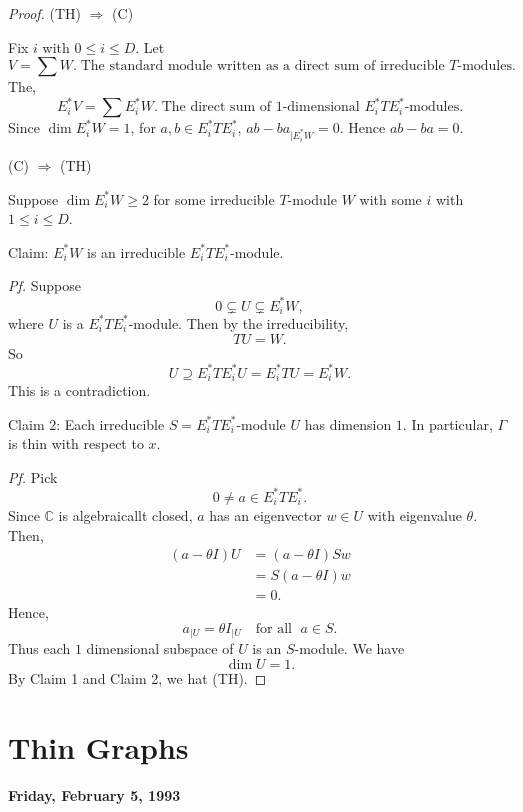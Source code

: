 \documentclass[
]{book}
\theoremstyle{definition}
\theoremstyle{definition}
\theoremstyle{definition}
\theoremstyle{definition}
\theoremstyle{remark}
\begin{document}
\begin{proof}
\leavevmode

(TH) \(\Rightarrow\) (C)

Fix \(i\) with \(0\leq i\leq D\). Let
\[V = \sum W. \; \text{The standard module written as a direct sum of irreducible $T$-modules}.\]
The,
\[E_i^*V = \sum E_i^*W. \; \text{The direct sum of 1-dimensional $E_i^*TE_i^*$-modules}.\]
Since \(\dim E_i^*W = 1\), for \(a, b\in E_i^*TE_i^*\), \({ab - ba}_{| E_i^*W} = 0\). Hence \(ab - ba = 0\).

(C) \(\Rightarrow\) (TH)

Suppose \(\dim E_i^*W \geq 2\) for some irreducible \(T\)-module \(W\) with some \(i\) with \(1\leq i\leq D\).

Claim: \(E_i^*W\) is an irreducible \(E_i^*TE_i^*\)-module.

\emph{Pf.}
Suppose
\[0 \subsetneq U \subsetneq E_i^*W,\]
where \(U\) is a \(E_i^*TE_i^*\)-module. Then by the irreducibility,
\[TU = W.\]
So
\[U \supseteq E_i^*TE_i^*U = E_i^*TU = E^*_iW.\]
This is a contradiction.

Claim 2: Each irreducible \(S = E_i^*TE_i^*\)-module \(U\) has dimension \(1\). In particular, \(\Gamma\) is thin with respect to \(x\).

\emph{Pf.}
Pick
\[0\neq a \in E_i^*TE_i^*.\]
Since \(\mathbb{C}\) is algebraicallt closed, \(a\) has an eigenvector \(w\in U\) with eigenvalue \(\theta\). Then,
\begin{align}
(a- \theta I)U & = (a-\theta I)Sw\\
& = S(a-\theta I)w\\
& = 0.
\end{align}
Hence,
\[a_{|U} = \theta I_{|U} \quad \text{for all }\; a\in S.\]
Thus each \(1\) dimensional subspace of \(U\) is an \(S\)-module. We have
\[\dim U = 1.\]
By Claim 1 and Claim 2, we hat (TH).

\end{proof}

\hypertarget{lec8}{%
\chapter{Thin Graphs}\label{lec8}}

\textbf{Friday, February 5, 1993}
\end{document}
